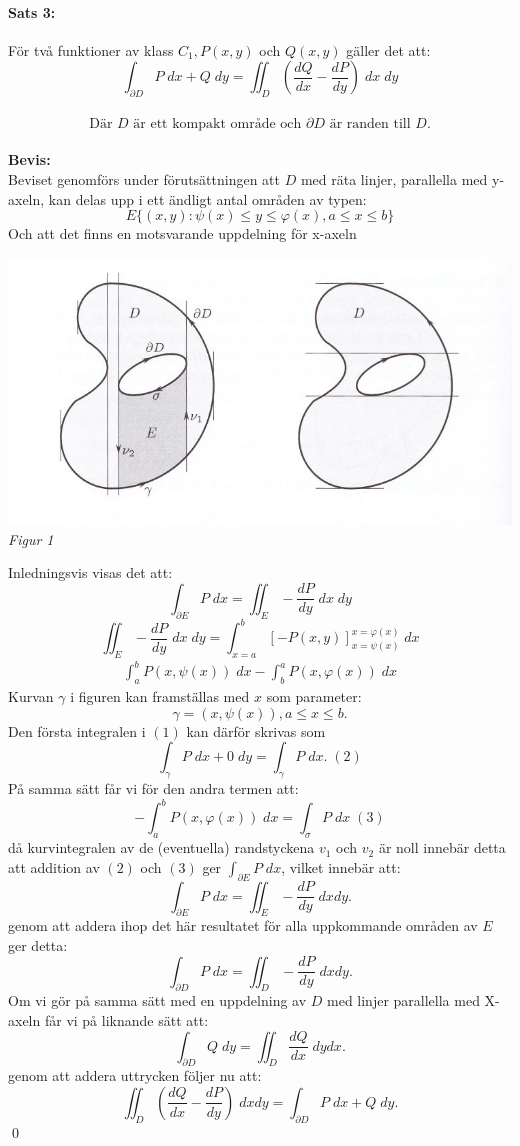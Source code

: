 \paragraph{Sats 3:} För två funktioner av klass $C_1, P(x, y)$ och $Q(x, y)$ gäller det att:
$$\int_{\partial D} P\; dx + Q \; dy = \iint_D \left ( \frac {d Q} {d x} - \frac {d P} {d y}
	\right ) \; dx \; dy$$\\
$$\text{Där $D$ är ett kompakt område och $\partial D$ är randen till $D$.}$$
\\
{\bf Bevis:} \\
Beviset genomförs under förutsättningen att $D$ med räta linjer, parallella med y-axeln, kan delas upp i ett 
ändligt antal områden av typen:
$$E \{ (x, y): \psi(x) \le y \le \varphi(x), a \le x \le b \}$$
Och att det finns en motsvarande uppdelning för x-axeln
\begin{center}
	\includegraphics[scale=0.5]{linus_0001.jpg}
	{\it Figur 1}
\end{center}
Inledningsvis visas det att:
$$\int_{\partial E} P \; dx = \iint_E - \frac {dP} {dy} \; dx \; dy$$
$$\iint_E - \frac {dP} {dy} \; dx \; dy = \int^b_{x=a} \left [ -P (x, y) \right ]^{x = \varphi(x)}_{x= \psi(x)} \; dx$$
\begin{align}
	\int_a^bP(x, \psi(x)) \; dx - \int_b^aP(x, \varphi(x)) \; dx
\end{align}
Kurvan $\gamma$ i figuren kan framställas med $x$ som parameter:
$$\gamma = (x, \psi(x)), a\le x \le b.$$
Den första integralen i $(1)$ kan därför skrivas som 
$$\int_{\gamma} P \; dx + 0 \; dy = \int_{\gamma} P \; dx. \; (2)$$
På samma sätt får vi för den andra termen att:
$$- \int_a^b P(x, \varphi(x)) \; dx = \int_{\sigma} P \; dx \; (3)$$ %
då kurvintegralen av de (eventuella) randstyckena $v_1$ och $v_2$ är noll innebär detta att
addition av $(2)$ och $(3)$ ger $\int_{\partial E} P \; dx$, vilket
innebär att:
$$\int_{\partial E} P \; dx = \iint_E - \frac {dP} {dy} \; dx dy.$$
genom att addera ihop det här resultatet för alla uppkommande områden av $E$ ger detta:
$$\int_{\partial D} P \; dx = \iint_D - \frac {dP} {dy} \; dx dy.$$
Om vi gör på samma sätt med en uppdelning av $D$ med linjer parallella med X-axeln får vi på liknande sätt att:
$$\int_{\partial D} Q \; dy = \iint_D \frac {dQ} {dx} \; dy dx.$$ 
genom att addera uttrycken följer nu att:
$$\iint_D \left ( \frac {dQ} {dx} - \frac {dP} {dy} \right ) \; dx dy = \int_{\partial D} P \; dx + Q \; dy.$$
\hfill \qed
